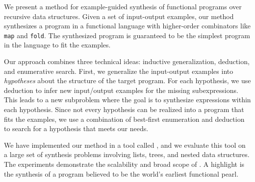 We present a method for example-guided synthesis of functional
programs over recursive data structures.  Given a set of input-output
examples, our method synthesizes a program in a functional language
with higher-order combinators like {\tt map} and {\tt fold}.  The
synthesized program is guaranteed to be the simplest program in the
language to fit the examples.

Our approach combines three technical ideas: inductive generalization,
deduction, and enumerative search.  First, we generalize the
input-output examples
into {\em hypotheses} about the structure of the target program. For
each hypothesis, we use deduction to infer new input/output examples
for the missing subexpressions. This leads to a new 
subproblem where the goal is to synthesize expressions within each
hypothesis. Since not every hypothesis can be realized into a program
that fits the examples, we use a combination of best-first enumeration
and deduction to search for a hypothesis that meets our needs.

We have implemented our method in a tool called \sys, and we evaluate
this tool on a large set of synthesis problems involving lists, trees,
and nested data structures. The experiments demonstrate the
scalability and broad scope of \sys. A highlight is the synthesis of a
program believed to be the world's earliest functional pearl.







